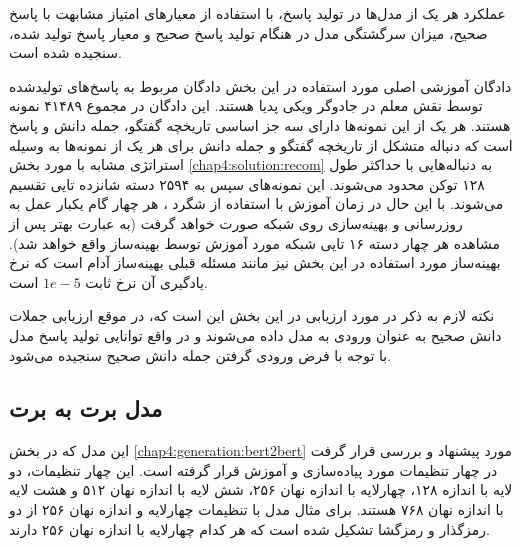 عملکرد هر یک از مدل‌ها در تولید پاسخ، با استفاده از معیار‌های امتیاز مشابهت
با پاسخ صحیح، میزان سرگشتگی مدل در هنگام تولید پاسخ صحیح و معیار
پاسخ تولید شده، سنجیده شده است.

دادگان آموزشی اصلی مورد استفاده در این بخش دادگان  مربوط به پاسخ‌های تولیدشده توسط نقش معلم در جادوگر ویکی پدیا هستند. این دادگان در مجموع ۴۱۴۸۹ نمونه هستند. هر یک از این نمونه‌ها دارای سه جز اساسی تاریخچه گفتگو، جمله دانش و پاسخ است که دنباله متشکل از تاریخچه گفتگو و جمله دانش برای هر یک از نمونه‌ها به وسیله استراتژی مشابه با مورد بخش
\ref{chap4:solution:recom}
به دنباله‌هایی با حداکثر طول ۱۲۸ توکن محدود می‌شوند. این نمونه‌های سپس به ۲۵۹۴ دسته شانزده تایی تقسیم می‌شوند. با این حال در زمان آموزش با استفاده از شگرد 
، هر چهار گام یکبار عمل به روزرسانی و بهینه‌سازی روی شبکه صورت خواهد گرفت (به عبارت بهتر پس از مشاهده هر چهار دسته ۱۶ تایی شبکه مورد آموزش توسط بهینه‌ساز واقع خواهد شد). بهینه‌ساز مورد استفاده در این بخش نیز مانند مسئله قبلی بهینه‌ساز آدام است که نرخ یادگیری آن نرخ ثابت 
$1e-5$
است. 

نکته لازم به ذکر در مورد ارزیابی در این بخش این است که، در موقع ارزیابی جملات دانش صحیح به عنوان ورودی به مدل داده‌ می‌شوند و در واقع توانایی تولید پاسخ مدل با توجه با فرض ورودی گرفتن جمله دانش صحیح سنجیده می‌شود. 

\subsection{مدل برت به برت}
این مدل که در بخش 
\ref{chap4:generation:bert2bert}
مورد پیشنهاد و بررسی قرار گرفت در چهار تنظیمات مورد پیاده‌سازی و آموزش قرار گرفته است. این چهار تنظیمات، دو لایه با اندازه ۱۲۸، چهارلایه با اندازه نهان ۲۵۶، شش لایه با اندازه نهان ۵۱۲ و هشت لایه با اندازه نهان ۷۶۸ هستند. برای مثال مدل با تنظیمات چهارلایه و اندازه نهان ۲۵۶ از دو رمزگذار و رمزگشا تشکیل شده است که هر کدام چهارلایه با اندازه نهان ۲۵۶ دارند. 

